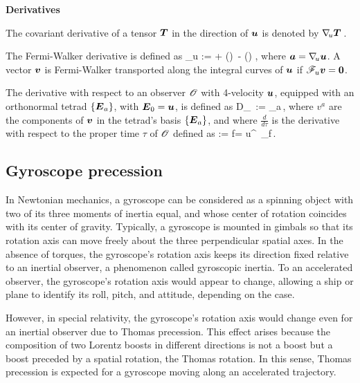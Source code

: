 \documentclass[12pt]{article}
\begin{document}
\begin{center} \bf Derivatives \end{center}
The covariant derivative of a tensor $\boldsymbol{T}$ in the direction of $\boldsymbol{u}$ is denoted by $\nabla\!_u\boldsymbol{T}$\,.

\noindent The Fermi-Walker derivative is defined as
\be
	\Fermi_u := \nablau {} +  (\cdot{})\, - (\cdot{})\,\,,
\ee
where $\boldsymbol{a}=\nabla\!_u\boldsymbol{u}$. A vector $\boldsymbol{v}$ is Fermi-Walker transported along the integral curves of $\boldsymbol{u}$ if $\mathscr{F}_u\boldsymbol{v}=\boldsymbol{0}$.

\noindent The derivative with respect to an observer $\mathscr{O}$ with 4-velocity $\boldsymbol{u}$, equipped with an orthonormal tetrad $\{\boldsymbol{E}_a\}$, with $\boldsymbol{E}_0=\boldsymbol{u}$, is defined as
\be
	D_\Obs\, := _a\,,
\ee
where $v^a$ are the components of $\boldsymbol{v}$ in the tetrad's basis $\{\boldsymbol{E}_a\}$, and where $\frac{d}{d\tau}$ is the derivative with respect to the proper time $\tau$ of $\mathscr{O}$ defined as
\be
	 := \nablau f= u^\mu\, \partial_\mu f\,.
\ee

\subsection{Gyroscope precession}
In Newtonian mechanics, a gyroscope can be considered as a spinning object with two of its three moments of inertia equal, and whose center of rotation coincides with its center of gravity. Typically, a gyroscope is mounted in gimbals so that its rotation axis can move freely about the three perpendicular spatial axes. In the absence of torques, the gyroscope's rotation axis keeps its direction fixed relative to an inertial observer, a phenomenon called gyroscopic inertia. To an accelerated observer, the gyroscope's rotation axis would appear to change, allowing a ship or plane to identify its roll, pitch, and attitude, depending on the case.

However, in special relativity, the gyroscope's rotation axis would change even for an inertial observer due to Thomas precession. This effect arises because the composition of two Lorentz boosts in different directions is not a boost but a boost preceded by a spatial rotation, the Thomas rotation. In this sense, Thomas precession is expected for a gyroscope moving along an accelerated trajectory. 
\end{document}
